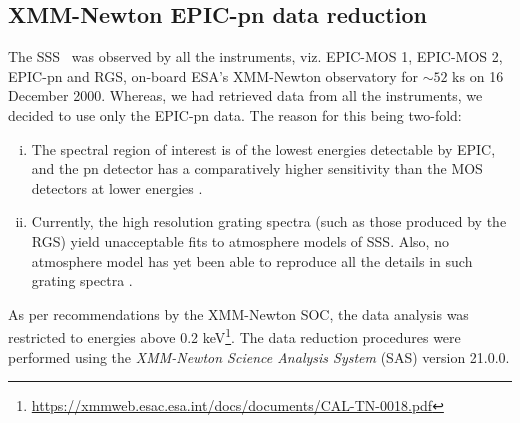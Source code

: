     \subsection{XMM-Newton EPIC-pn data reduction}
    	The SSS \source\ was observed by all the instruments, viz. EPIC-MOS 1, EPIC-MOS 2, EPIC-pn and RGS, on-board ESA's XMM-Newton observatory for $\sim 52$ ks on 16 December 2000. Whereas, we had retrieved data from all the instruments, we decided to use only the EPIC-pn data. The reason for this being two-fold:
    	\begin{enumerate}[i.]
    		\item The spectral region of interest is of the lowest energies detectable by EPIC, and the pn detector has a comparatively higher sensitivity than the MOS detectors at lower energies \cite{stecchini2023revisiting,mateos2009statistical}.
    		\item Currently, the high resolution grating spectra (such as those produced by the RGS) yield unacceptable fits to atmosphere models of SSS. Also, no atmosphere model has yet been able to reproduce all the details in such grating spectra \cite{ness2020complications}.
    	\end{enumerate}
    	As per recommendations by the XMM-Newton SOC, the data analysis was restricted to energies above 0.2 keV\footnote{\url{https://xmmweb.esac.esa.int/docs/documents/CAL-TN-0018.pdf}}. The data reduction procedures were performed using the \textit{XMM-Newton Science Analysis System} (SAS) version 21.0.0.
    
